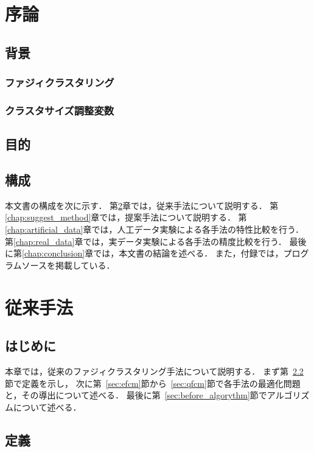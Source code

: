 \documentclass[a4j,12pt,dvipdfmx,oneside]{jsbook}
\theoremstyle{definition}
\begin{document}
\pagestyle{headings}
\def\thepage{\roman{page}}

\tableofcontents
\listoffigures
\listoftables
\newpage
\pagestyle{myheadings}
%
%
%
\chapter{序論}
\def\thepage{\arabic{page}}
\setcounter{page}{1}
\label{chap:first}
%
\section{背景}\label{sec:background}
%
\subsection{ファジィクラスタリング}\label{subsec:fuzzy_clustering}
%
\subsection{クラスタサイズ調整変数}\label{subsec:cluster_adjust_var}
%
\section{目的}\label{sec:purpose}
%
\section{構成}\label{sec:contents}
本文書の構成を次に示す．
第\ref{chap:before_method}章では，従来手法について説明する．
第\ref{chap:suggest_method}章では，提案手法について説明する．
第\ref{chap:artificial_data}章では，人工データ実験による各手法の特性比較を行う．
第\ref{chap:real_data}章では，実データ実験による各手法の精度比較を行う．
最後に第\ref{chap:conclusion}章では，本文書の結論を述べる．
また，付録では，プログラムソースを掲載している．
%
%
%
\chapter{従来手法}\label{chap:before_method}
%
\section{はじめに}\label{sec:before_method_intro}
本章では，従来のファジィクラスタリング手法について説明する．
まず第~\ref{sec:before_method_define}節で定義を示し，
次に第~\ref{sec:efcm}節から~\ref{sec:qfcm}節で各手法の最適化問題と，その導出について述べる．
最後に第~\ref{sec:before_algorythm}節でアルゴリズムについて述べる．
%
\section{定義}\label{sec:before_method_define}
%
\end{document}
